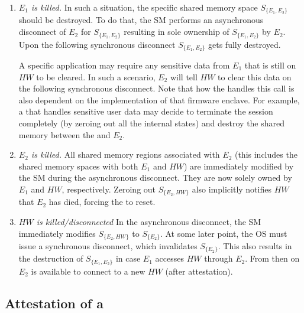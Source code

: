 \begin{enumerate}

\item\emph{$E_1$ is killed.} In such a situation, the specific shared memory space $S_{\{E_1, E_2\}}$ should be destroyed. To do that, the SM performs an asynchronous disconnect of $E_2$ for $S_{\{E_1, E_2\}}$ resulting in sole ownership of $S_{\{E_1, E_2\}}$ by $E_2$. Upon the following synchronous disconnect $S_{\{E_1, E_2\}}$ gets fully destroyed.

A specific application may require any sensitive data from $E_1$ that is still on $HW$ to be cleared. In such a scenario, $E_2$ will tell $HW$ to clear this data on the following synchronous disconnect. Note that how the \sphw handles this call is also dependent on the implementation of that \sphw firmware enclave. For example, a \sphw that handles sensitive user data may decide to terminate the session completely (by zeroing out all the internal states) and destroy the shared memory between the \sphw and $E_2$.

    
\item\emph{$E_2$ is killed.} All shared memory regions associated with $E_2$ (this includes the shared memory spaces with both $E_1$ and $HW$) are immediately modified by the SM during the asynchronous disconnect. They are now solely owned by $E_1$ and $HW$, respectively. Zeroing out $S_{\{E_2, HW\}}$ also implicitly notifies $HW$ that $E_2$ has died, forcing the \sphw to reset.
    
\item\emph{$HW$ is killed/disconnected} In the asynchronous disconnect, the SM immediately modifies $S_{\{E_2, HW\}}$ to $S_{\{E_2\}}$. At some later point, the OS must issue a synchronous disconnect, which invalidates $S_{\{E_2\}}$. This also results in the destruction of $S_{\{E_1, E_2\}}$ in case $E_1$ accesses $HW$ through $E_2$. From then on $E_2$ is available to connect to a new $HW$ (after attestation).

\end{enumerate}

\subsection{Attestation of a \nameenclave{}}
\label{sec:approach:attestation}

